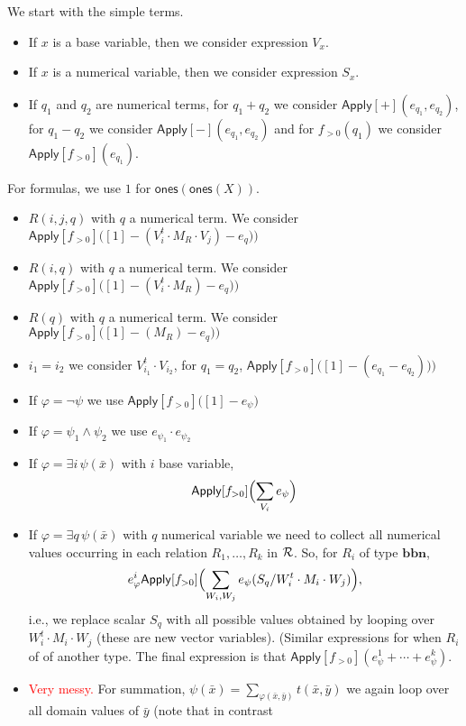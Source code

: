 We start with the simple terms.
\begin{itemize}
\item If $x$ is a base variable, then we consider expression $V_{x}$.
\item If $x$ is a numerical variable, then we consider expression $S_x$.
\item If $q_1$ and $q_2$ are numerical terms, for $q_1+q_2$ we consider $\mathsf{Apply}[+](e_{q_1},e_{q_2})$, for $q_1-q_2$ we consider 
$\mathsf{Apply}[-](e_{q_1},e_{q_2})$ and for $f_{>0}(q_1)$ we consider $\mathsf{Apply}[f_{>0}](e_{q_1})$.
\end{itemize}
For formulas, we use $1$ for $\mathsf{ones}(\mathsf{ones}(X))$.
\begin{itemize}
\item $R(i,j,q)$ with $q$ a numerical term. We consider  $\mathsf{Apply}[f_{>0}]\bigl([1]-(V_i^t\cdot M_R\cdot V_j)-e_q)\bigr)$
\item $R(i,q)$ with $q$ a numerical term. We consider  $\mathsf{Apply}[f_{>0}]\bigl([1]-(V_i^t\cdot M_R)-e_q)\bigr)$
\item $R(q)$ with $q$ a numerical term. We consider  $\mathsf{Apply}[f_{>0}]\bigl([1]-(M_R)-e_q)\bigr)$
\item $i_1=i_2$ we consider $V_{i_1}^t\cdot V_{i_2}$, for $q_1=q_2$,  $\mathsf{Apply}[f_{>0}]\bigl([1]-(e_{q_1}-e_{q_2}))\bigr)$
\item  If $\varphi=\neg \psi$ we use $\mathsf{Apply}[f_{>0}]\bigl([1]- e_\psi\bigr)$
\item  If $\varphi=\psi_1\land \psi_2$ we use $e_{\psi_1}\cdot e_{\psi_2}$
\item If $\varphi=\exists i\, \psi(\bar x)$ with $i$ base variable,
$$
\mathsf{Apply}[f_{>0}]\Bigl(\sum_{V_i} e_\psi  \Bigr)
$$
\item If $\varphi=\exists q\, \psi(\bar x)$ with $q$ numerical variable we need to collect all numerical values occurring in each relation $R_1,\ldots,R_k$ in ${\cal R}$.
So, for $R_i$ of type $\mathbf{b}\mathbf{b}\mathbf{n}$,
$$
e_\varphi^i\mathsf{Apply}[f_{>0}]\Bigl(\sum_{W_i,W_j} e_\psi(S_q/W_i^t\cdot M_i\cdot W_j)  \Bigr),
$$
i.e., we replace scalar $S_q$ with all possible values obtained by looping over $W_i^t\cdot M_i\cdot W_j$ (these are new vector variables).
(Similar expressions for when $R_i$ of of another type.
The final expression is  that  $\mathsf{Apply}[f_{>0}](e_\psi^1+\cdots+e_{\psi}^k)$.
\item \textcolor{red}{Very messy.} For summation, $\psi(\bar x)=\sum_{\varphi(\bar x,\bar y)} t(\bar x,\bar y)$  we again loop over all domain values of $\bar y$ (note that in contrast

\end{itemize}
